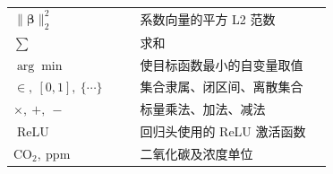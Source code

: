 \documentclass[UTF8,a4paper,11pt]{ctexart}
\begin{document}
\begin{longtable}{>{\raggedright\arraybackslash}p{0.37\linewidth}p{0.57\linewidth}}
$\lVert\boldsymbol{\beta}\rVert_2^2$ & 系数向量的平方 L2 范数 \\
$\sum$ & 求和 \\
$\arg\min$ & 使目标函数最小的自变量取值 \\
$\in,\ [0,1],\ \{\cdots\}$ & 集合隶属、闭区间、离散集合 \\
$\times,\ +,\ -$ & 标量乘法、加法、减法 \\
$\operatorname{ReLU}$ & 回归头使用的 ReLU 激活函数 \\
$\mathrm{CO}_{2},\ \mathrm{ppm}$ & 二氧化碳及浓度单位 \\
\bottomrule\end{longtable}
\end{document}
